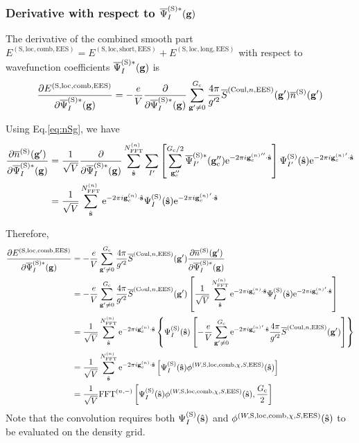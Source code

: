 \documentclass[paper=a4, fontsize=11pt]{article} %
\numberwithin{equation}{section} %
\numberwithin{figure}{section} %
\numberwithin{table}{section} %
\newcommand{\p}{\partial}
\newcommand{\ol}{\overline}
\newcommand{\bs}{{\bf{s}}}
\newcommand{\bg}{{\bf{g}}}
\newcommand{\hs}{{\hat{\bf{s}}}}
\newcommand{\rS}{{\mathrm{S}}}
\newcommand{\rEES}{{\mathrm{EES}}}
\newcommand{\re}{{\mathrm{e}}}
\newcommand{\rCo}{{\mathrm{Coul}}}
\newcommand{\rshort}{{\mathrm{short}}}
\newcommand{\rlong}{{\mathrm{long}}}
\newcommand{\rcomb}{{\mathrm{comb}}}
\newcommand{\rlo}{{\mathrm{loc}}}
\newcommand{\gcn}{{\bg_c^{(n)}}}
\newcommand{\igcns}{2\pi i\gcn\cdot\hat \bs}
\newcommand{\igpcns}{2\pi i\gcn'\cdot\hat \bs}
\newcommand{\psigsc}{{\overline \Psi_I^{(\rS)*}(\bg)}}
\newcommand{\NFFTn}{{N^{(n)}_{\mathrm{FFT}}}}
\newcommand{\Gc}{{G_{\mathrm{c}}}}
\newcommand{\hGc}{{\frac{G_{\mathrm{c}}}{2}}}
\newcommand{\FFTni}{{\mathrm{FFT}^{(n,-)}}}
\begin{document}
\subsubsection{Derivative with respect to $\psigsc$}
The derivative of the combined smooth part $E^{(\rS,\rlo,\rcomb,\rEES)} = E^{(\rS,\rlo,\rshort,\rEES)} + E^{(\rS,\rlo,\rlong,\rEES)}$ with respect to wavefunction coefficients $\psigsc$ is
\begin{equation}
\begin{split}
\frac{\p E^{(\rS,\rlo,\rcomb,\rEES)}}{ \p \psigsc}
&=  -\frac{e}{V} \frac{\p }{ \p \psigsc}\sum_{\bg' \neq 0}^\Gc \frac{4\pi }{g'^2} \ol S^{(\rCo,n,\rEES)}(\bg')\overline{n}^{(\rS)}(\bg')\\
\end{split}
\end{equation}

Using Eq.\eqref{eq:nSg}, we have
\begin{equation}\label{eq:dnSgdp}
\begin{split}
\frac{\p \ol {n}^{(\rS)}(\bg')}{ \p \psigsc}
&= \frac{1}{\sqrt V} \frac{\p }{ \p \psigsc} \sum_{\hat \bs}^\NFFTn  \sum_{I'}  \left[\sum_{\bg''_c}^{\Gc/2} \overline{\Psi}_{I'}^{(\rS)*}(\bg''_c)  \re^{-2\pi i \gcn'' \cdot \hat \bs}\right] \Psi_{I'}^{(\rS)}(\hat \bs) \re^{-\igpcns} \\
&= \frac{1}{\sqrt V} \sum_{\hat \bs}^\NFFTn   \re^{-\igcns}\Psi_{I}^{(\rS)}(\hat \bs) \re^{-\igpcns}
\end{split}
\end{equation}

Therefore,
\begin{equation}
\begin{split}
\frac{\p E^{(\rS,\rlo,\rcomb,\rEES)}}{ \p \psigsc}
&= -\frac{e}{V} \sum_{\bg' \neq 0}^\Gc \frac{4\pi }{g'^2} \ol S^{(\rCo,n,\rEES)}(\bg')\frac{\p \ol{n}^{(\rS)}(\bg') }{ \p \psigsc}\\
&= -\frac{e}{V} \sum_{\bg' \neq 0}^\Gc \frac{4\pi }{g'^2} \ol S^{(\rCo,n,\rEES)}(\bg')\left[\frac{1}{\sqrt V} \sum_{\hat \bs}^\NFFTn   \re^{-\igcns}\Psi_{I}^{(\rS)}(\hat \bs) \re^{-\igpcns}\right]\\
&= \frac{1}{\sqrt V} \sum_{\hat \bs}^\NFFTn   \re^{-\igcns}\left\{\Psi_{I}^{(\rS)}(\hat \bs) \left[-\frac{e}{V} \sum_{\bg' \neq 0}^{\Gc} \re^{-\igpcns} \frac{4\pi }{g'^2} \ol S^{(\rCo,n,\rEES)}(\bg')\right] \right\}\\
&=  \frac{1}{\sqrt V} \sum_{\hat \bs}^\NFFTn   \re^{-\igcns}\left[\Psi_{I}^{(\rS)}(\hat \bs) \phi^{(W,\rS,\rlo,\rcomb,\chi,S,\rEES)}(\hs)\right] \\
&= \frac{1}{\sqrt V} \FFTni \left[\Psi_{I}^{(\rS)}(\hat \bs) \phi^{(W,\rS,\rlo,\rcomb,\chi,S,\rEES)}(\hs),\hGc \right]
\end{split}
\end{equation}
Note that the convolution requires both $\Psi_{I}^{(\rS)}(\hat \bs)$ and $\phi^{(W,\rS,\rlo,\rcomb,\chi,S,\rEES)}(\hs)$ to be evaluated on the density grid.
\end{document}
